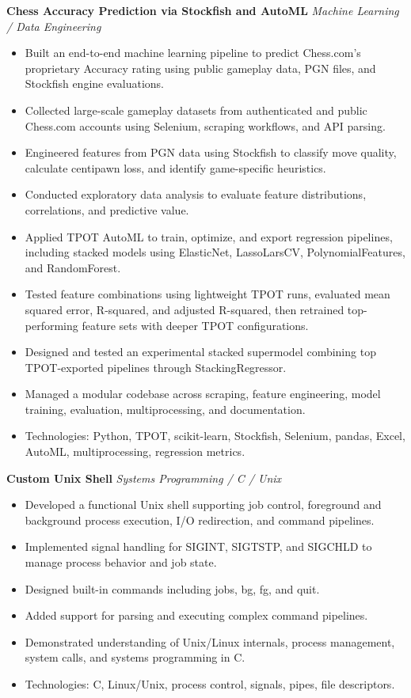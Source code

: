 \documentclass[10.5pt,letterpaper]{article}
\begin{document}
\textbf{Chess Accuracy Prediction via Stockfish and AutoML} \hfill \textit{Machine Learning / Data Engineering}\par
\begin{itemize}
\item Built an end-to-end machine learning pipeline to predict Chess.com's proprietary Accuracy rating using public gameplay data, PGN files, and Stockfish engine evaluations.
\item Collected large-scale gameplay datasets from authenticated and public Chess.com accounts using Selenium, scraping workflows, and API parsing.
\item Engineered features from PGN data using Stockfish to classify move quality, calculate centipawn loss, and identify game-specific heuristics.
\item Conducted exploratory data analysis to evaluate feature distributions, correlations, and predictive value.
\item Applied TPOT AutoML to train, optimize, and export regression pipelines, including stacked models using ElasticNet, LassoLarsCV, PolynomialFeatures, and RandomForest.
\item Tested feature combinations using lightweight TPOT runs, evaluated mean squared error, R-squared, and adjusted R-squared, then retrained top-performing feature sets with deeper TPOT configurations.
\item Designed and tested an experimental stacked supermodel combining top TPOT-exported pipelines through StackingRegressor.
\item Managed a modular codebase across scraping, feature engineering, model training, evaluation, multiprocessing, and documentation.
\item Technologies: Python, TPOT, scikit-learn, Stockfish, Selenium, pandas, Excel, AutoML, multiprocessing, regression metrics.
\end{itemize}
\textbf{Custom Unix Shell} \hfill \textit{Systems Programming / C / Unix}\par
\begin{itemize}
\item Developed a functional Unix shell supporting job control, foreground and background process execution, I/O redirection, and command pipelines.
\item Implemented signal handling for SIGINT, SIGTSTP, and SIGCHLD to manage process behavior and job state.
\item Designed built-in commands including jobs, bg, fg, and quit.
\item Added support for parsing and executing complex command pipelines.
\item Demonstrated understanding of Unix/Linux internals, process management, system calls, and systems programming in C.
\item Technologies: C, Linux/Unix, process control, signals, pipes, file descriptors.
\end{itemize}
\end{document}
